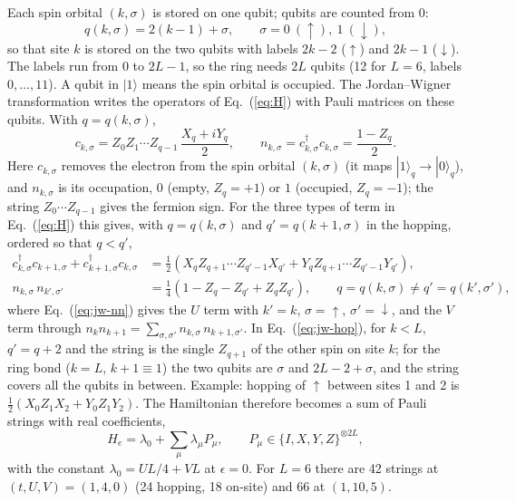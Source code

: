\documentclass[11pt,a4paper]{article}
\newcommand{\cd}{c^\dagger}
\newcommand{\up}{\uparrow}
\newcommand{\dn}{\downarrow}
\begin{document}
Each spin orbital $(k,\sigma)$ is stored on one qubit; qubits are counted
from 0:
\begin{equation}\label{eq:qubit}
  q(k,\sigma) = 2(k-1) + \sigma , \qquad \sigma = 0 \ (\up), \ 1 \ (\dn),
\end{equation}
so that site $k$ is stored on the two qubits with labels $2k-2$ ($\up$) and
$2k-1$ ($\dn$). The labels run from $0$ to $2L-1$, so the ring needs $2L$
qubits (12 for $L = 6$, labels $0,\dots,11$). A qubit in
$|1\rangle$ means the spin orbital is occupied. The Jordan--Wigner
transformation writes the operators of Eq.~(\ref{eq:H}) with Pauli matrices on
these qubits. With $q = q(k,\sigma)$,
\begin{equation}\label{eq:jw}
  c_{k,\sigma} = Z_0 Z_1 \cdots Z_{q-1}\, \frac{X_q + i Y_q}{2} , \qquad
  n_{k,\sigma} = \cd_{k,\sigma} c_{k,\sigma} = \frac{1 - Z_q}{2} .
\end{equation}
Here $c_{k,\sigma}$ removes the electron from the spin orbital $(k,\sigma)$
(it maps $|1\rangle_q \to |0\rangle_q$), and $n_{k,\sigma}$ is its occupation,
$0$ (empty, $Z_q = +1$) or $1$ (occupied, $Z_q = -1$); the string
$Z_0 \cdots Z_{q-1}$ gives the fermion sign. For the three types of term in
Eq.~(\ref{eq:H}) this gives, with $q = q(k,\sigma)$ and $q' = q(k+1,\sigma)$
in the hopping, ordered so that $q < q'$,
\begin{align}
  \cd_{k,\sigma} c_{k+1,\sigma} + \cd_{k+1,\sigma} c_{k,\sigma}
     &= \tfrac12 \left( X_q Z_{q+1} \cdots Z_{q'-1} X_{q'}
                      + Y_q Z_{q+1} \cdots Z_{q'-1} Y_{q'} \right) , \label{eq:jw-hop}\\
  n_{k,\sigma}\, n_{k',\sigma'}
     &= \tfrac14 \left( 1 - Z_q - Z_{q'} + Z_q Z_{q'} \right) ,
        \qquad q = q(k,\sigma) \ne q' = q(k',\sigma') , \label{eq:jw-nn}
\end{align}
where Eq.~(\ref{eq:jw-nn}) gives the $U$ term with $k' = k$, $\sigma = \up$,
$\sigma' = \dn$, and the $V$ term through
$n_k n_{k+1} = \sum_{\sigma,\sigma'} n_{k,\sigma}\, n_{k+1,\sigma'}$.
In Eq.~(\ref{eq:jw-hop}), for $k < L$, $q' = q + 2$ and the string is the single
$Z_{q+1}$ of the other spin on site $k$; for the ring bond ($k = L$,
$k+1 \equiv 1$) the two qubits are $\sigma$ and $2L-2+\sigma$, and the string
covers all the qubits in between. Example: hopping of $\up$ between sites 1
and 2 is $\tfrac12 (X_0 Z_1 X_2 + Y_0 Z_1 Y_2)$.
The Hamiltonian therefore becomes a sum of Pauli strings with real coefficients,
\begin{equation}\label{eq:H-pauli}
  H_e = \lambda_0 + \sum_{\mu} \lambda_\mu P_\mu , \qquad P_\mu \in \{I, X, Y, Z\}^{\otimes 2L} ,
\end{equation}
with the constant $\lambda_0 = UL/4 + VL$ at $\epsilon = 0$.
For $L = 6$ there are 42 strings at $(t,U,V) = (1,4,0)$ (24 hopping, 18 on-site)
and 66 at $(1,10,5)$.
\end{document}
